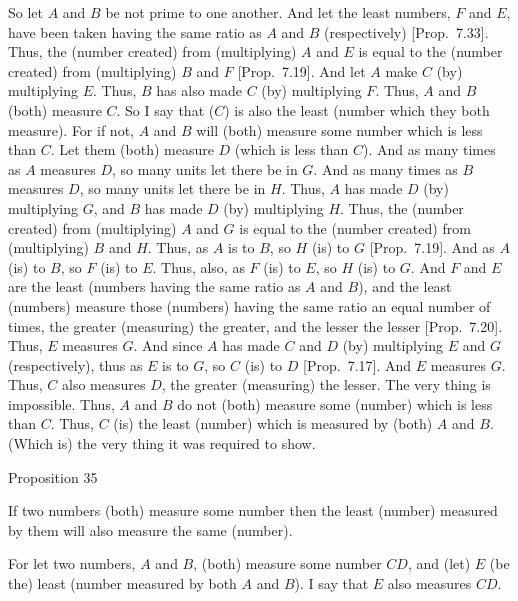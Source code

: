 So let $A$ and $B$ be not prime to one another. And let the least numbers,
$F$ and $E$, have been taken having the same ratio as $A$ and $B$ (respectively)
[Prop.~7.33]. Thus, the (number created)
from (multiplying) $A$ and $E$ is equal to the (number created) from (multiplying) $B$ and $F$ [Prop.~7.19].
And let $A$ make $C$ (by) multiplying $E$. Thus, $B$ has also made $C$
(by) multiplying $F$. Thus, $A$ and $B$ (both) measure $C$. So I say that
($C$) is also the least (number which they both measure). For if not, 
$A$ and $B$ will (both) measure some number which is less than $C$. Let them
(both) measure $D$ 
(which is less than $C$). And as many times as $A$ measures $D$, so many units
let there be in $G$.
And as many times as $B$ measures $D$,
so many units let there be in $H$. Thus, $A$ has made $D$ (by) multiplying $G$, and $B$
has made $D$ (by) multiplying $H$. Thus, the (number created) from (multiplying) $A$ and $G$ is equal to the (number created)
from (multiplying) $B$ and $H$. Thus, as $A$ is to $B$, so $H$ (is) to $G$ [Prop.~7.19]. And as $A$ (is) to $B$, so $F$ (is) to $E$.
Thus, also, as $F$ (is) to $E$, so $H$ (is) to $G$. And $F$ and $E$ are the least
(numbers having the same ratio as $A$ and $B$), and the least (numbers) measure
those (numbers) having the same ratio an equal number of times, the
greater (measuring) the greater, and the lesser the lesser [Prop.~7.20]. Thus, $E$ measures $G$. And since $A$
has made $C$ and $D$ (by) multiplying $E$ and $G$ (respectively), thus as
$E$ is to $G$, so $C$ (is) to $D$ [Prop.~7.17].
And $E$ measures $G$. Thus, $C$ also measures $D$, the greater (measuring) the
lesser. The very thing is impossible. Thus, $A$ and $B$ do not (both) measure some (number) which is less than $C$. Thus, $C$ (is) the least (number) which is measured by (both) $A$
and $B$. (Which is) the very thing it was required to show.


\begin{center}
{\large Proposition 35}
\end{center}

If two numbers (both) measure some number
then the least (number) measured by them will also measure the same (number).

\epsfysize=1in
\centerline{}

For let two numbers, $A$ and $B$, (both) measure some number $CD$, and
(let) $E$  (be the) least (number measured by both $A$ and $B$). I say that $E$
also measures $CD$.

